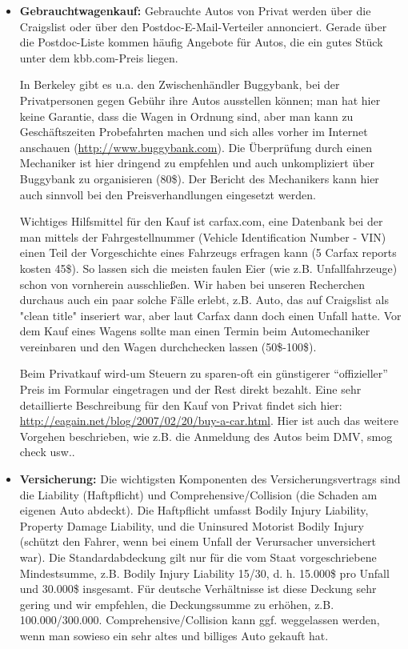 \documentclass[a4paper]{scrreprt}
\begin{document}
\begin{itemize}
	\item \textbf{Gebrauchtwagenkauf:} Gebrauchte Autos von Privat werden über die Craigslist oder über den Postdoc-E-Mail-Verteiler annonciert. Gerade über die Postdoc-Liste kommen häufig Angebote für Autos, die ein gutes Stück unter dem kbb.com-Preis liegen.

	In Berkeley gibt es u.a. den Zwischenhändler Buggybank, bei der Privatpersonen gegen Gebühr ihre Autos ausstellen können; man hat hier keine Garantie, dass die Wagen in Ordnung sind, aber man kann zu Geschäftszeiten Probefahrten machen und sich alles vorher im Internet anschauen (\url{http://www.buggybank.com}). Die Überprüfung durch einen Mechaniker ist hier dringend zu empfehlen und auch unkompliziert über Buggybank zu organisieren (80\$). Der Bericht des Mechanikers kann hier auch sinnvoll bei den Preisverhandlungen eingesetzt werden.
	
	Wichtiges Hilfsmittel für den Kauf ist carfax.com, eine Datenbank bei der man mittels der Fahrgestellnummer (Vehicle Identification Number - VIN) einen Teil der Vorgeschichte eines Fahrzeugs erfragen kann (5 Carfax reports kosten 45\$). So lassen sich die meisten faulen Eier (wie z.B. Unfallfahrzeuge) schon von vornherein ausschließen. Wir haben bei unseren Recherchen durchaus auch ein paar solche Fälle erlebt, z.B. Auto, das auf Craigslist als "clean title" inseriert war, aber laut Carfax dann doch einen Unfall hatte. Vor dem Kauf eines Wagens sollte man einen Termin beim Automechaniker vereinbaren und den Wagen durchchecken lassen (50\$-100\$).

	Beim Privatkauf wird-um Steuern zu sparen-oft ein günstigerer "`offizieller"' Preis im Formular eingetragen und der Rest direkt bezahlt. Eine sehr detaillierte Beschreibung für den Kauf von Privat findet sich hier: \url{http://eagain.net/blog/2007/02/20/buy-a-car.html}. Hier ist auch das weitere Vorgehen beschrieben, wie z.B. die Anmeldung des Autos beim DMV, smog check usw..
	
	\item \textbf{Versicherung:} Die wichtigsten Komponenten des Versicherungsvertrags sind die Liability (Haftpflicht) und Comprehensive/Collision (die Schaden am eigenen Auto abdeckt). Die Haftpflicht umfasst Bodily Injury Liability, Property Damage Liability, und die Uninsured Motorist Bodily Injury (schützt den Fahrer, wenn bei einem Unfall der Verursacher unversichert war). Die Standardabdeckung gilt nur für die vom Staat vorgeschriebene Mindestsumme, z.B. Bodily Injury Liability 15/30, d. h. 15.000\$ pro Unfall und 30.000\$ insgesamt. Für deutsche Verhältnisse ist diese Deckung sehr gering und wir empfehlen, die Deckungssumme zu erhöhen, z.B. 100.000/300.000. Comprehensive/Collision kann ggf. weggelassen werden, wenn man sowieso ein sehr altes und billiges Auto gekauft hat.


\end{itemize}
\end{document}
